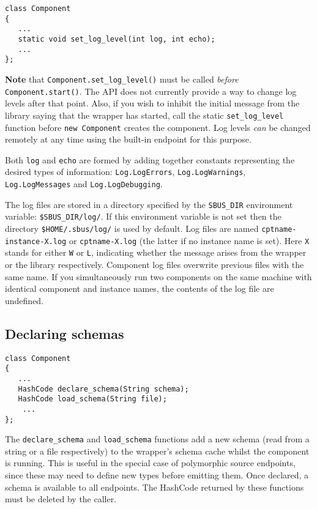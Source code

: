 \documentclass[12pt,a4paper,twoside]{article}
\renewcommand{\_}{\texttt{\symbol{95}}}
\begin{document}
\begin{verbatim}
class Component
{
   ...
   static void set_log_level(int log, int echo);
   ...
};
\end{verbatim}

\textbf{Note} that \verb^Component.set_log_level()^ must be called
\textit{before} \verb^Component.start()^. The API does not currently
provide a way to change log levels after that point.
Also, if you wish to inhibit the initial message from the library saying
that the wrapper has started, call the static \verb^set_log_level^ function
before \verb^new Component^ creates the component.
Log levels \textit{can} be changed remotely at any time using the built-in
endpoint for this purpose.

Both \verb^log^ and \verb^echo^ are formed by adding together
constants representing the desired types of information:
\verb^Log.LogErrors^, \verb^Log.LogWarnings^, \verb^Log.LogMessages^ and
\verb^Log.LogDebugging^.

The log files are stored in a directory specified by the \verb^SBUS_DIR^
environment variable: \verb^$SBUS_DIR/log/^.
If this environment variable is not set then the
directory \verb^$HOME/.sbus/log/^ is used by default.
Log files are named \verb^cptname-instance-X.log^ or \verb^cptname-X.log^
(the latter if no instance name is set).
Here \verb^X^ stands for either \verb^W^ or \verb^L^, indicating whether
the message arises from the wrapper or the library respectively.
Component log files overwrite previous files with the same name.
If you simultaneously run two components on the same machine with
identical component and instance names, the contents of the log
file are undefined.

\subsection{Declaring schemas}

\begin{verbatim}
class Component
{
   ...
   HashCode declare_schema(String schema);
   HashCode load_schema(String file);
	...
};
\end{verbatim}

The \verb^declare_schema^ and \verb^load_schema^ functions add
a new schema (read from a string or a file respectively) to the wrapper's
schema cache whilst the component is running.
This is useful in the special case of polymorphic
source endpoints, since these may need to define new types
before emitting them.
Once declared, a schema is available to all endpoints.
The HashCode returned by these functions must be deleted by the caller.
\end{document}

